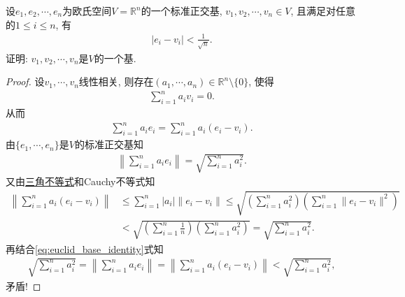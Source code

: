 \documentclass[../../main.tex]{subfiles}%
\begin{document}
\begin{example}
设$e_1,e_2,\cdots,e_n$为欧氏空间$V=\mathbb{R}^n$的一个标准正交基, $v_1,v_2,\cdots,v_n\in V$, 且满足对任意的$1\leqslant i\leqslant n$, 有
\begin{align*}
|e_i - v_i| < \frac{1}{\sqrt{n}}.
\end{align*}
证明: $v_1,v_2,\cdots,v_n$是$V$的一个基.
\end{example}
\begin{proof}
设$v_1,\cdots,v_n$线性相关, 则存在$(a_1,\cdots,a_n)\in\mathbb{R}^n\setminus\{0\}$, 使得
\begin{align*}
\sum\limits_{i=1}^n a_i v_i = 0.
\end{align*}
从而
\begin{align}
\sum\limits_{i=1}^n a_i e_i = \sum\limits_{i=1}^n a_i (e_i - v_i). \label{eq:euclid_base_identity}
\end{align}
由$\{e_1,\cdots,e_n\}$是$V$的标准正交基知
\begin{align*}
\left\| \sum\limits_{i=1}^n a_i e_i \right\| = \sqrt{\sum\limits_{i=1}^n a_i^2}.
\end{align*}
又由\hyperref[theorem:范数的基本性质]{三角不等式}和Cauchy不等式知
\begin{align*}
\left\| \sum\limits_{i=1}^n a_i (e_i - v_i) \right\| &\leqslant \sum\limits_{i=1}^n |a_i| \| e_i - v_i \| \leqslant \sqrt{\left( \sum\limits_{i=1}^n a_i^2 \right) \left( \sum\limits_{i=1}^n \| e_i - v_i \|^2 \right)} \\
&< \sqrt{\left( \sum\limits_{i=1}^n \frac{1}{n} \right) \left( \sum\limits_{i=1}^n a_i^2 \right)} = \sqrt{\sum\limits_{i=1}^n a_i^2}.
\end{align*}
再结合\eqref{eq:euclid_base_identity}式知
\begin{align*}
\sqrt{\sum\limits_{i=1}^n a_i^2} = \left\| \sum\limits_{i=1}^n a_i e_i \right\| = \left\| \sum\limits_{i=1}^n a_i (e_i - v_i) \right\| < \sqrt{\sum\limits_{i=1}^n a_i^2},
\end{align*}
矛盾!
\end{proof}
\end{document}
